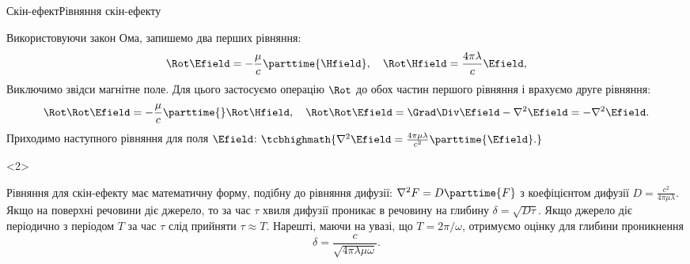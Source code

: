 \documentclass[onlytextwidth]{beamer}
\begin{document}
\begin{frame}{Скін-ефект}{Рівняння скін-ефекту}
\begin{onlyenv}
		\begin{block}{}\justifying
			Використовуючи закон
			Ома, запишемо два перших рівняння:
			\begin{equation*}
				\Rot\Efield = - \frac{\mu}{c}\parttime{\Hfield},\quad \Rot\Hfield = \frac{4\pi\lambda}{c}\Efield,
			\end{equation*}
			Виключимо звідси магнітне поле. Для цього застосуємо операцію $\Rot$ до
			обох частин першого рівняння і врахуємо друге рівняння:
			\begin{equation*}
				\Rot\Rot\Efield = - \frac{\mu}{c}\parttime{}\Rot\Hfield, \quad \Rot\Rot\Efield = \Grad\Div\Efield - \nabla^2\Efield = -
				\nabla^2\Efield.
			\end{equation*}
			Приходимо наступного рівняння для поля $\Efield$:
			\(
			\tcbhighmath{\nabla^2\Efield = \frac{4\pi\mu\lambda}{c^2}\parttime{\Efield}.}
			\)
		\end{block}
	\end{onlyenv}
	\begin{onlyenv}
		\begin{block}{}\justifying\small
			Рівняння для скін-ефекту має математичну форму, подібну до рівняння дифузії:
			\(
			\nabla^2 F = D \parttime{F}
			\)
			з коефіцієнтом дифузії $D = \frac{c^2}{4\pi\mu\lambda}$. Якщо на
			поверхні речовини діє джерело, то за час $\tau$ хвиля дифузії
			проникає в речовину на глибину $\delta = \sqrt{D\tau}$. Якщо джерело діє
			періодично з періодом $T$ за час $\tau$ слід прийняти
			$\tau \approx T$.
			Нарешті, маючи на увазі, що $T = 2\pi/\omega$, отримуємо \alert{оцінку} для глибини проникнення
			\begin{equation*}
				\delta =\frac{c}{\sqrt{4\pi\lambda\mu\omega}}.
			\end{equation*}
		\end{block}


\end{onlyenv}
\end{frame}
\end{document}
